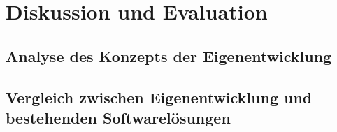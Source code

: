 \chapter{Diskussion und Evaluation}
\section{Analyse des Konzepts der Eigenentwicklung}
\section{Vergleich zwischen Eigenentwicklung und bestehenden Softwarelösungen}